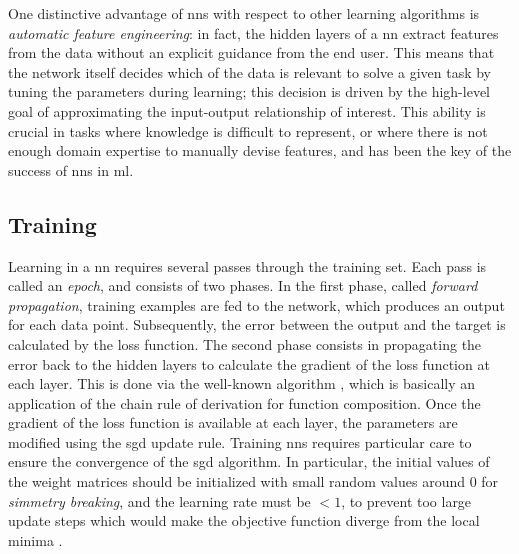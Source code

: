 One distinctive advantage of \glspl{nn} with respect to other learning algorithms is \emph{automatic feature engineering}: in fact, the hidden layers of a \gls{nn} extract features from the data without an explicit guidance from the end user. This means that the network itself decides which  of the data is relevant to solve a given task by tuning the parameters during learning; this decision is driven by the high-level goal of approximating the input-output relationship of interest. This ability is crucial in tasks where knowledge is difficult to represent, or where there is not enough domain expertise to manually devise features, and has been the key of the success of \glspl{nn} in \gls{ml}.

\subsection{Training}\label{sec:training}
Learning in a \gls{nn} requires several passes through the training set. Each pass is called an \emph{epoch}, and consists of two phases. In the first phase, called \emph{forward propagation}, training examples are fed to the network, which produces an output for each data point. Subsequently, the error between the output and the target is calculated by the loss function. The second phase consists in propagating the error back to the hidden layers to calculate the gradient of the loss function at each layer. This is done via the well-known  algorithm \citep{rumelhart1986backprop}, which is basically an application of the chain rule of derivation for function composition. Once the gradient of the loss function is available at each layer, the parameters are modified using the \gls{sgd} update rule. Training \glspl{nn} requires particular care to ensure the convergence of the \gls{sgd} algorithm. In particular, the initial values of the weight matrices should be initialized with small random values around 0 for \emph{simmetry breaking}, and the learning rate must be $< 1$, to prevent too large update steps which would make the objective function diverge from the local minima \citep{lecun1998backprop}.

